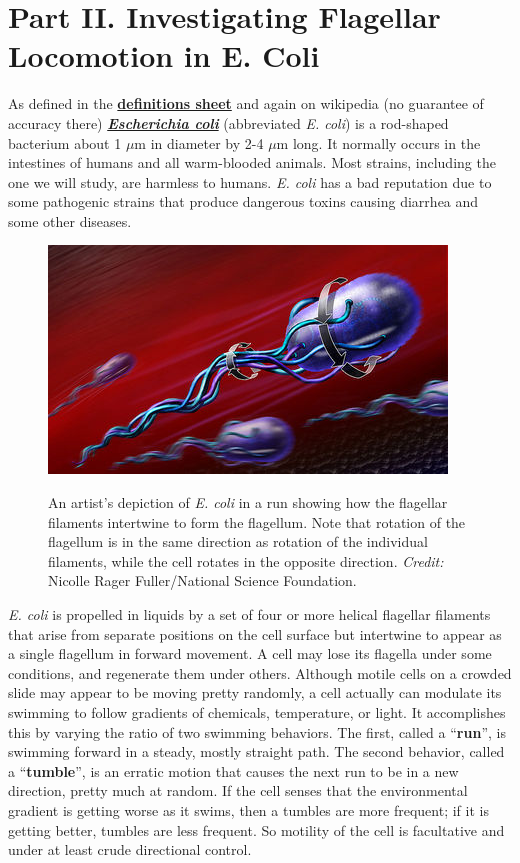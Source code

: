 \documentclass{../lab}
\begin{document}
\section{Part II. Investigating Flagellar Locomotion in E. Coli}

As defined in the \href{http://physics111.lib.berkeley.edu/Physics111/Reprints/OTZ/biowikipedia.pdf}{\textbf{definitions sheet}} and again on wikipedia (no guarantee of accuracy there) \emph{\href{http://en.wikipedia.org/wiki/Escherichia\_coli}{\textbf{Escherichia coli}}} (abbreviated \emph{E. coli}) is a rod-shaped bacterium about 1 $\mu$m in diameter by 2-4 $\mu$m long. It normally occurs in the intestines of humans and all warm-blooded animals. Most strains, including the one we will study, are harmless to humans. \emph{E. coli} has a bad reputation due to some pathogenic strains that produce dangerous toxins causing diarrhea and some other diseases.

\begin{figure}[h]
    \centering
    \href{http://experimentationlab.berkeley.edu/sites/default/files/images/400px-Ecoli800.jpg}{\includegraphics[width=0.5\linewidth]{images/400px-Ecoli800.jpg}}
    \caption{An artist's depiction of \emph{E. coli} in a run showing how the flagellar filaments intertwine to form the flagellum. Note that rotation of the flagellum is in the same direction as rotation of the individual filaments, while the cell rotates in the opposite direction. \emph{Credit:} Nicolle Rager Fuller/National Science Foundation.}
    \label{fig:400px-Ecoli800}
\end{figure}

\emph{E. coli} is propelled in liquids by a set of four or more helical flagellar filaments that arise from separate positions on the cell surface but intertwine to appear as a single flagellum in forward movement. A cell may lose its flagella under some conditions, and regenerate them under others. Although motile cells on a crowded slide may appear to be moving pretty randomly, a cell actually can modulate its swimming to follow gradients of chemicals, temperature, or light. It accomplishes this by varying the ratio of two swimming behaviors. The first, called a ``\textbf{run}'', is swimming forward in a steady, mostly straight path. The second behavior, called a ``\textbf{tumble}'', is an erratic motion that causes the next run to be in a new direction, pretty much at random. If the cell senses that the environmental gradient is getting worse as it swims, then a tumbles are more frequent; if it is getting better, tumbles are less frequent. So motility of the cell is facultative and under at least crude directional control.
\end{document}
